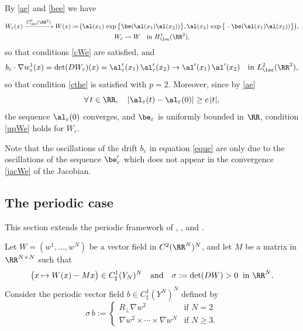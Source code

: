 By \eqref{ae} and \eqref{bee} we have
\begin{gather*}
 W_\varepsilon(x)\xrightarrow{C^0_\loc(\RR^2)}W(x)\!:=\!\bigl(\al(x_1)\,\exp\big\{\be(\al(x_1)\al(x_2))\big\},\al(x_2)\,\exp\big\{\!-\!\be(\al(x_1)\al(x_2))\big\}\bigr),
\\
W_\varepsilon\rightharpoonup W \quad\mbox{in }H^1_\loc(\RR^2),
\end{gather*}
so that conditions \eqref{cWe} are satisfied, and
\begin{equation}\label{jacWe}
b_\varepsilon\cdot\nabla w_\varepsilon^1(x)=\det(DW_\varepsilon)(x)=\al_\varepsilon'(x_1)\,\al_\varepsilon'(x_2)\to \al'(x_1)\,\al'(x_2)\quad\mbox{in }L^2_\loc(\RR^2),
\end{equation}
so that condition \eqref{cthe} is satisfied with $p=2$.
Moreover, since by \eqref{ae}
\[
\forall\,t\in\RR,\quad |\al_\varepsilon(t)-\al_\varepsilon(0)|\geq c\,|t|,
\]
the sequence $\al_\varepsilon(0)$ converges, and $\be_\varepsilon$ is uniformly bounded in $\RR$, condition \eqref{upWe} holds for $W_\varepsilon$.

Note that the oscillations of the drift $b_\varepsilon$ in equation \eqref{eque} are only due to the oscillations of the sequence $\be'_\varepsilon$ which does not appear in the convergence \eqref{jacWe} of the Jacobian.

\subsection{The periodic case}\label{ss.per}
This section extends the periodic framework of \cite{Bre,HoXi,Tas}, \cite[Th.\,8]{Gol1}, and \cite[Cor.\,4.4]{Bri}.

Let $W=(w^1,\dots,w^N)$ be a vector field in $C^2(\RR^N)^N$, and let $M$ be a matrix in $\RR^{N\times N}$ such that
\begin{equation}\label{siW}
\big(x\mapsto W(x)-Mx\big)\in C^1_\sharp(Y_N)^N\quad\mbox{and}\quad \sigma:=\det(DW)>0\;\;\mbox{in }\RR^N.
\end{equation}
Consider the periodic vector field $b\in C^1_\sharp(Y^N)^N$ defined by
\begin{equation}\label{sib}
\sigma\,b:=\begin{cases}
R_\perp\nabla w^2 & \mbox{if }N=2
\\[3pt]
\nabla w^2\times\cdots\times \nabla w^N & \mbox{if }N\geq 3.
\end{cases}
\end{equation}

